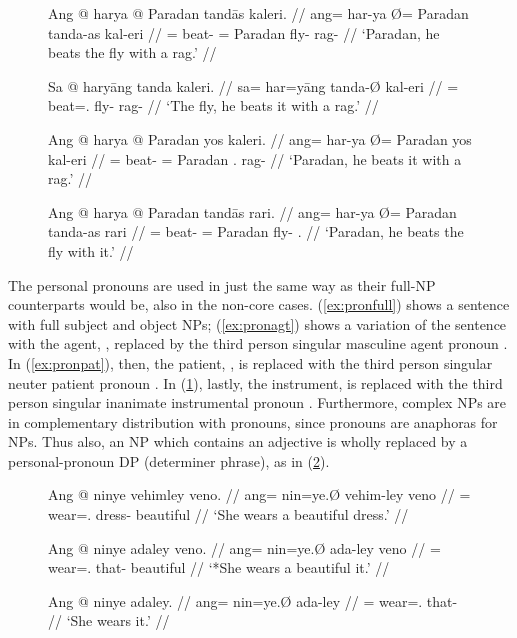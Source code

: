 \begin{figure}[h]
\pex\label{ex:perspro}
\a\label{ex:pronfull}\begingl
	\gla Ang @ harya {} @ Paradan tandās kaleri. //
	\glb ang= har-ya Ø= Paradan tanda-as kal-eri //
	\glc \AgtT{}= beat-\TsgM{} \Top{}= Paradan fly-\Parg{} rag-\Ins{} //
	\glft `Paradan, he beats the fly with a rag.' //
\endgl

\a\label{ex:pronagt}\begingl
	\gla Sa @ haryāng tanda kaleri. //
	\glb sa= har=yāng tanda-Ø kal-eri //
	\glc \PatT{}= beat=\TsgM{}.\Aarg{} fly-\Top{} rag-\Ins{} //
	\glft `The fly, he beats it with a rag.' //
\endgl

\a\label{ex:pronpat}\begingl
	\gla Ang @ harya {} @ Paradan yos kaleri. //
	\glb ang= har-ya Ø= Paradan yos kal-eri //
	\glc \AgtT{}= beat-\TsgM{} \Top{}= Paradan \TsgN{}.\Parg{} rag-\Ins{} //
	\glft `Paradan, he beats it with a rag.' //
\endgl

\a\label{ex:pronins}\begingl
	\gla Ang @ harya {} @ Paradan tandās rari. //
	\glb ang= har-ya Ø= Paradan tanda-as rari //
	\glc \AgtT{}= beat-\TsgM{} \Top{}= Paradan fly-\Parg{} \TsgI{}.\Ins{} //
	\glft `Paradan, he beats the fly with it.' //
\endgl
\xe
\end{figure}

The personal pronouns are used in just the same way as their full-NP
counterparts would be, also in the non-core cases. (\ref{ex:pronfull}) shows a
sentence with full subject and object NPs; (\ref{ex:pronagt}) shows a variation
of the sentence with the agent, , replaced by the third
person singular masculine agent pronoun . In
(\ref{ex:pronpat}), then, the patient, , is replaced
with the third person singular neuter patient pronoun . In
(\ref{ex:pronins}), lastly, the instrument,  is
replaced with the third person singular inanimate instrumental pronoun
. Furthermore, complex NPs are in complementary
distribution with pronouns, since pronouns are anaphoras for NPs. Thus also, an
NP which contains an adjective is wholly replaced by a personal-pronoun DP 
(determiner phrase), as in (\ref{ex:procompldist}).

\begin{figure}[h]
\pex\label{ex:procompldist}
\a\begingl
	\gla Ang @ ninye vehimley veno. //
	\glb ang= nin=ye.Ø vehim-ley veno //
	\glc \AgtT{}= wear=\TsgF{}.\Top{} dress-\PargI{} beautiful //
	\glft `She wears a beautiful dress.' //
\endgl

\a\ljudge* \begingl
	\gla Ang @ ninye adaley veno. //
	\glb ang= nin=ye.Ø ada-ley veno //
	\glc \AgtT{}= wear=\TsgF{}.\Top{} that-\PargI{} beautiful //
	\glft `*She wears a beautiful it.' //
\endgl

\a\begingl
	\gla Ang @ ninye adaley. //
	\glb ang= nin=ye.Ø ada-ley //
	\glc \AgtT{}= wear=\TsgF{}.\Top{} that-\PargI{} //
	\glft `She wears it.' //
\endgl
\xe
\end{figure}

